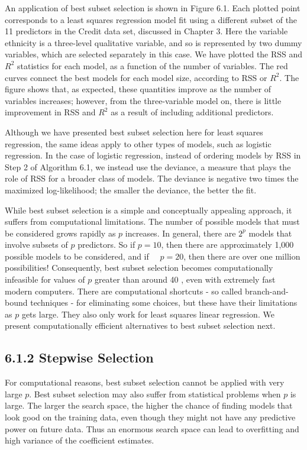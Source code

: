\documentclass[10pt]{article}
\begin{document}
An application of best subset selection is shown in Figure 6.1. Each plotted point corresponds to a least squares regression model fit using a different subset of the 11 predictors in the Credit data set, discussed in Chapter 3. Here the variable ethnicity is a three-level qualitative variable, and so is represented by two dummy variables, which are selected separately in this case. We have plotted the RSS and $R^{2}$ statistics for each model, as a function of the number of variables. The red curves connect the best models for each model size, according to RSS or $R^{2}$. The figure shows that, as expected, these quantities improve as the number of variables increases; however, from the three-variable model on, there is little improvement in RSS and $R^{2}$ as a result of including additional predictors.

Although we have presented best subset selection here for least squares regression, the same ideas apply to other types of models, such as logistic regression. In the case of logistic regression, instead of ordering models by RSS in Step 2 of Algorithm 6.1, we instead use the deviance, a measure that plays the role of RSS for a broader class of models. The deviance is negative two times the maximized log-likelihood; the smaller the deviance, the better the fit.

While best subset selection is a simple and conceptually appealing approach, it suffers from computational limitations. The number of possible models that must be considered grows rapidly as $p$ increases. In general, there are $2^{p}$ models that involve subsets of $p$ predictors. So if $p=10$, then there are approximately 1,000 possible models to be considered, and if\
\
$p=20$, then there are over one million possibilities! Consequently, best subset selection becomes computationally infeasible for values of $p$ greater than around 40 , even with extremely fast modern computers. There are computational shortcuts - so called branch-and-bound techniques - for eliminating some choices, but these have their limitations as $p$ gets large. They also only work for least squares linear regression. We present computationally efficient alternatives to best subset selection next.

\subsection*{6.1.2 Stepwise Selection}
For computational reasons, best subset selection cannot be applied with very large $p$. Best subset selection may also suffer from statistical problems when $p$ is large. The larger the search space, the higher the chance of finding models that look good on the training data, even though they might not have any predictive power on future data. Thus an enormous search space can lead to overfitting and high variance of the coefficient estimates.
\end{document}
